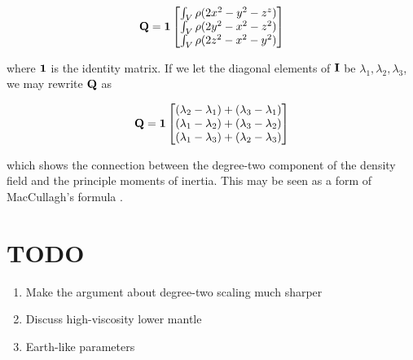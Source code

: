 \documentclass[extra,mreferee]{gji}
\begin{document}
\begin{equation}
\begin{equation}
{\bf Q} = {\bf 1} \begin{bmatrix}
\int_V \rho (2 x^2 - y^2 - z^z)\\
\int_V \rho (2 y^2 - x^2 -z^2)\\
\int_V \rho (2 z^2 - x^2 - y^2) 
\end{bmatrix}
\end{equation}

where $\bf 1$ is the identity matrix.  If we let the diagonal elements of $\bf I$ be $\lambda_1, \lambda_2, \lambda_3$, we may rewrite $\bf Q$ as

\begin{equation}
{\bf Q} = {\bf 1} \begin{bmatrix}
(\lambda_2-\lambda_1) + (\lambda_3-\lambda_1)\\
(\lambda_1-\lambda_2) + (\lambda_3-\lambda_2)\\
(\lambda_1-\lambda_3) + (\lambda_2-\lambda_3)\\
\end{bmatrix}
\label{eq:maccullagh}
\end{equation}

which shows the connection between the degree-two component of the density field and the principle moments of inertia.  This may be seen as a form of MacCullagh's formula \citep{munk1960rotation}.


\section {TODO}

\begin{enumerate}
\item Make the argument about degree-two scaling much sharper
\item Discuss high-viscosity lower mantle
\item Earth-like parameters
\end{enumerate}

\label{lastpage}
\end{document}
